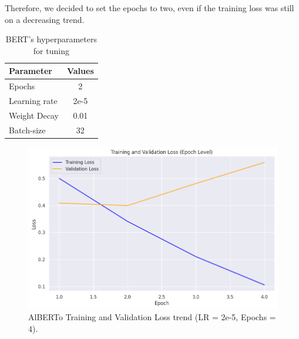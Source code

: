 Therefore, we decided to set the epochs to two, even if the training loss was still on a decreasing trend. 

\begin{table}[h]
    \centering
    \begin{tabular}{|l|c|}
    \hline
    \textbf{Parameter} & \textbf{Values} \\ \hline
    Epochs & 2\\ \hline
    Learning rate & 2e-5\\ \hline
    Weight Decay & 0.01 \\ \hline
    Batch-size & 32 \\ \hline
    \end{tabular}
    \caption{BERT's hyperparameters for tuning}
    \label{tab:training_params}
\end{table}

\begin{figure}
    \includegraphics[width=\columnwidth]{../../results/images/alberto_losses_4epochs.png}
    \caption{AlBERTo Training and Validation Loss trend (LR = 2e-5, Epochs = 4).}
    \label{fig:example_losses}
\end{figure}